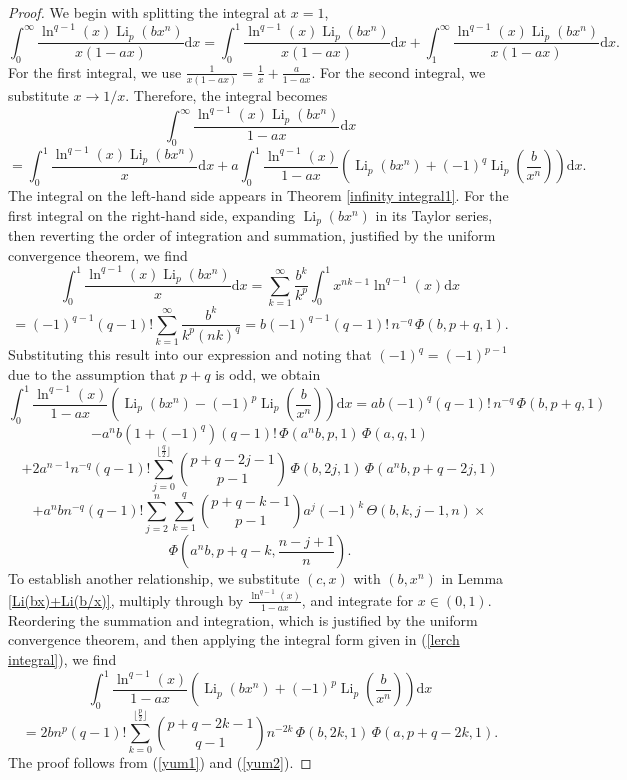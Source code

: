 \documentclass[11pt,reqno]{article}
\begin{document}
\begin{proof}
	We begin with splitting the integral at $x=1$,
	\[\int_0^\infty\frac{\ln^{q-1}(x)\operatorname{Li}_{p}(bx^{n})}{x(1-ax)}\mathrm{d} x=\int_0^1\frac{\ln^{q-1}(x)\operatorname{Li}_{p}(bx^{n})}{x(1-ax)}\mathrm{d} x+\int_1^\infty\frac{\ln^{q-1}(x)\operatorname{Li}_{p}(bx^{n})}{x(1-ax)}\mathrm{d} x.\]
	For the first integral, we use $\frac{1}{x(1-ax)}=\frac{1}{x}+\frac{a}{1-ax}$. For the second integral, we substitute $x\to 1/x$. Therefore, the integral becomes
	\[\int_0^\infty\frac{\ln^{q-1}(x)\operatorname{Li}_{p}(bx^{n})}{1-ax}\mathrm{d} x\]
	\[=\int_0^1\frac{\ln^{q-1}(x)\operatorname{Li}_{p}(bx^{n})}{x}\mathrm{d} x+a\int_0^1\frac{\ln^{q-1}(x)}{1-ax}\left(\operatorname{Li}_{p}(bx^{n})+{(-1)}^{q} \operatorname{Li}_{p}\left(\frac{b}{x^n}\right)\right)\mathrm{d} x.\]
	The integral on the left-hand side appears in Theorem \ref{infinity integral1}. For the first integral on the right-hand side, expanding $\operatorname{Li}_{p}(bx^{n})$ in its Taylor series, then reverting the order of integration and summation, justified by the uniform convergence theorem, we find
	\[\int_0^1\frac{\ln^{q-1}(x)\operatorname{Li}_p(bx^n)}{x}\mathrm{d} x=\sum_{k=1}^\infty\frac{b^k}{k^p}\int_0^1 x^{nk-1}\ln^{q-1}(x)\mathrm{d} x\]
	\begin{equation}
		={(-1)}^{q-1}(q-1)!\sum_{k=1}^\infty\frac{b^k}{k^p(nk)^{q}}=b{(-1)}^{q-1}(q-1)!\,n^{-q}\,\Phi(b,p+q,1).\label{ff}
	\end{equation}
	Substituting this result into our expression and noting that ${(-1)}^{q}={(-1)}^{p-1}$ due to the assumption that $p+q$ is odd, we obtain
	\[\int_0^1\frac{\ln^{q-1}(x)}{1-ax}\left(\operatorname{Li}_{p}(bx^{n})-{(-1)}^{p} \operatorname{Li}_{p}\left(\frac{b}{x^n}\right)\right)\mathrm{d} x=ab{(-1)}^{q}(q-1)!\,n^{-q}\,\Phi(b,p+q,1)\]
	\[-a^{n}b(1+{(-1)}^{q})(q-1)!\,\Phi(a^nb,p,1)\,\Phi(a,q,1)\]
	\[+2a^{n-1} n^{-q} (q-1)!\sum_{j=0}^{\lfloor\frac{q}{2}\rfloor}\binom{p+q-2j-1}{p-1}\,\Phi(b,2j,1)\,\Phi(a^nb,p+q-2j,1)\]		
	\[+a^{n}b n^{-q}(q-1)!\sum_{j=2}^{n}\sum_{k=1}^{q}\binom{p+q-k-1}{p-1}a^{j}{(-1)}^{k}\,\Theta(b,k,j-1,n)\times\]
	\begin{equation}
		\Phi\left(a^nb,p+q-k,\frac{n-j+1}{n}\right).\label{yum1}
	\end{equation}
	To establish another relationship, we substitute $(c,x)$ with $(b,x^{n})$ in Lemma \ref{Li(bx)+Li(b/x)}, multiply through by $\frac{\ln^{q-1}(x)}{1-ax}$, and integrate for $x\in(0,1)$. Reordering the summation and integration, which is justified by the uniform convergence theorem, and then applying the integral form given in (\ref{lerch integral}), we find
	\[\int_0^1\frac{\ln^{q-1}(x)}{1-ax}\left(\operatorname{Li}_{p}(bx^{n})+{(-1)}^{p} \operatorname{Li}_{p}\left(\frac{b}{x^n}\right)\right)\mathrm{d} x\]
	\begin{equation}
		=2b n^{p}(q-1)!\sum_{k=0}^{\lfloor\frac{p}{2}\rfloor}\binom{p+q-2k-1}{q-1}n^{-2k}\,\Phi(b,2k,1)\,\Phi(a,p+q-2k,1).\label{yum2}
	\end{equation}
	The proof follows from (\ref{yum1}) and (\ref{yum2}).
\end{proof}
\end{document}
